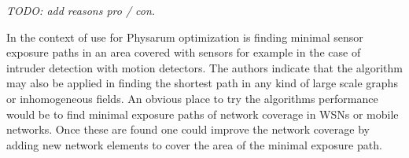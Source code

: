 \documentclass[cameraready]{IWORK2014}
\begin{document}
\textit{TODO: add reasons pro / con.}

In \cite{liu2012physarum} the context of use for Physarum optimization is finding minimal sensor exposure paths in an area covered with sensors for example in the case of intruder detection with motion detectors. The authors indicate that the algorithm may also be applied in finding the shortest path in any kind of large scale graphs or inhomogeneous fields. An obvious place to try the algorithms performance would be to find minimal exposure paths of network coverage in WSNs or mobile networks. Once these are found one could improve the network coverage by adding new network elements to cover the area of the minimal exposure path.



\end{document}
